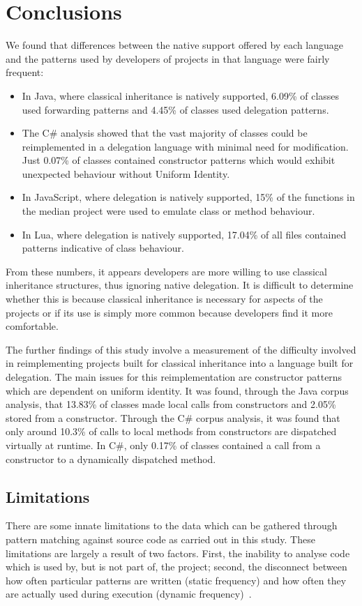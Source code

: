 \chapter{Conclusions}\label{C:con}
We found that differences between the native support offered by each language and the patterns used by developers of projects in that language were fairly frequent:
\begin{itemize}
	\item In Java, where classical inheritance is natively supported, 6.09\% of classes used forwarding patterns and 4.45\% of classes used delegation patterns.
	\item The C\# analysis showed that the vast majority of classes could be reimplemented in a delegation language with minimal need for modification. Just 0.07\% of classes contained constructor patterns which would exhibit unexpected behaviour without Uniform Identity.
	\item In JavaScript, where delegation is natively supported, 15\% of the functions in the median project were used to emulate class or method behaviour.
	\item In Lua, where delegation is natively supported, 17.04\% of all files contained patterns indicative of class behaviour.
\end{itemize}
From these numbers, it appears developers are more willing to use classical inheritance structures, thus ignoring native delegation. It is difficult to determine whether this is because classical inheritance is necessary for aspects of the projects or if its use is simply more common because developers find it more comfortable.
\newline

The further findings of this study involve a measurement of the difficulty involved in reimplementing projects built for classical inheritance into a language built for delegation. The main issues for this reimplementation are constructor patterns which are dependent on uniform identity. It was found, through the Java corpus analysis, that 13.83\% of classes made local calls from constructors and 2.05\% stored  from a constructor. Through the C\# corpus analysis, it was found that only around 10.3\% of calls to local methods from constructors are dispatched virtually at runtime. In C\#, only 0.17\% of classes contained a call from a constructor to a dynamically dispatched method.

\section{Limitations}
There are some innate limitations to the data which can be gathered through pattern matching against source code as carried out in this study. These limitations are largely a result of two factors. First, the inability to analyse code which is used by, but is not part of, the project; second, the disconnect between how often particular patterns are written (static frequency) and how often they are actually used during execution (dynamic frequency)~\cite{StaticAnalysisLimits}.

